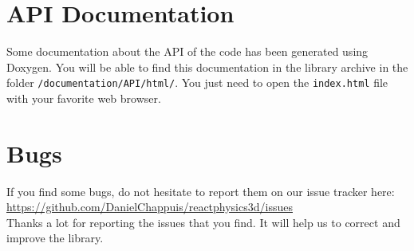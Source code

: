 \documentclass[a4paper,12pt]{article}
\begin{document}
   \section{API Documentation}

   Some documentation about the API of the code has been generated
   using Doxygen. You will be able to find this documentation in the library archive in the folder \texttt{/documentation/API/html/}. You just
   need to open the \texttt{index.html} file with your favorite web browser.

    \section{Bugs}

    If you find some bugs, do not hesitate to report them on our issue tracker here: \\

    \url{https://github.com/DanielChappuis/reactphysics3d/issues} \\

    Thanks a lot for reporting the issues that you find. It will help us to correct and improve the library.
\end{document}
